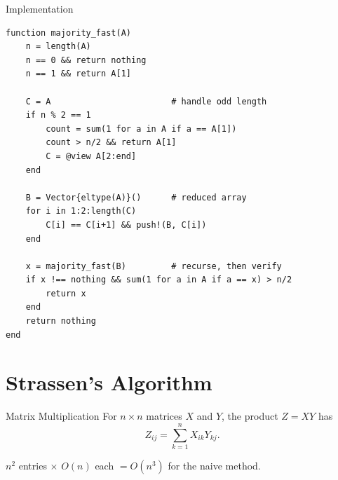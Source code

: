 \documentclass[10pt,aspectratio=169]{beamer}
\begin{document}
\begin{frame}[fragile]{Implementation}
  \begin{lstlisting}
function majority_fast(A)
    n = length(A)
    n == 0 && return nothing
    n == 1 && return A[1]

    C = A                        # handle odd length
    if n % 2 == 1
        count = sum(1 for a in A if a == A[1])
        count > n/2 && return A[1]
        C = @view A[2:end]
    end

    B = Vector{eltype(A)}()      # reduced array
    for i in 1:2:length(C)
        C[i] == C[i+1] && push!(B, C[i])
    end

    x = majority_fast(B)         # recurse, then verify
    if x !== nothing && sum(1 for a in A if a == x) > n/2
        return x
    end
    return nothing
end
  \end{lstlisting}
\end{frame}

\section{Strassen's Algorithm}

\begin{frame}{Matrix Multiplication}
  For $n \times n$ matrices $X$ and $Y$, the product $Z = XY$ has
  \[
    Z_{ij} = \sum_{k=1}^{n} X_{ik} Y_{kj}.
  \]

  \bigskip
  \begin{center}
  \end{center}

  \bigskip
  \begin{center}
    $n^2$ entries $\times$ $O(n)$ each $= O(n^3)$ for the naive method.
  \end{center}
\end{frame}
\end{document}
